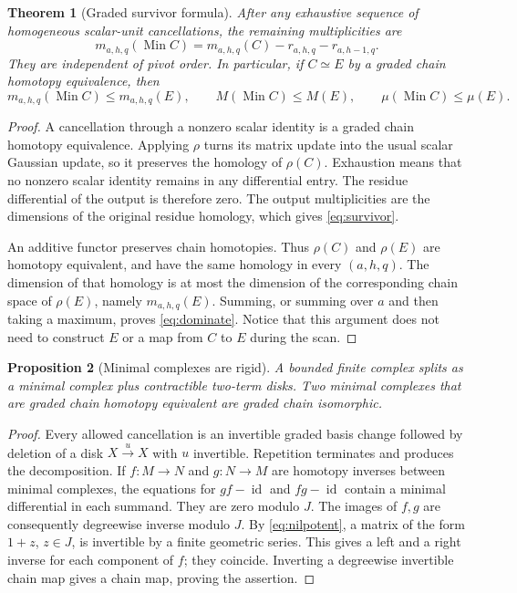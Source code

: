 \documentclass[11pt,letterpaper]{article}
\newtheorem{theorem}{Theorem}[section]
\newtheorem{proposition}[theorem]{Proposition}
\theoremstyle{remark}\newtheorem{remark}[theorem]{Remark}
\newcommand{\Min}{\operatorname{Min}}
\newcommand{\id}{\operatorname{id}}
\begin{document}
\begin{theorem}[Graded survivor formula]\label{thm:survivor}
After any exhaustive sequence of homogeneous scalar-unit cancellations, the remaining multiplicities are
\begin{equation}\label{eq:survivor}
 m_{a,h,q}(\Min C)=m_{a,h,q}(C)-r_{a,h,q}-r_{a,h-1,q}.
\end{equation}
They are independent of pivot order. In particular, if $C\simeq E$ by a graded chain homotopy equivalence, then
\begin{equation}\label{eq:dominate}
 m_{a,h,q}(\Min C)\le m_{a,h,q}(E),\qquad
 M(\Min C)\le M(E),\qquad \mu(\Min C)\le\mu(E).
\end{equation}
\end{theorem}
\begin{proof}
A cancellation through a nonzero scalar identity is a graded chain homotopy equivalence. Applying $\rho$ turns its matrix update into the usual scalar Gaussian update, so it preserves the homology of $\rho(C)$. Exhaustion means that no nonzero scalar identity remains in any differential entry. The residue differential of the output is therefore zero. The output multiplicities are the dimensions of the original residue homology, which gives \eqref{eq:survivor}.

An additive functor preserves chain homotopies. Thus $\rho(C)$ and $\rho(E)$ are homotopy equivalent, and have the same homology in every $(a,h,q)$. The dimension of that homology is at most the dimension of the corresponding chain space of $\rho(E)$, namely $m_{a,h,q}(E)$. Summing, or summing over $a$ and then taking a maximum, proves \eqref{eq:dominate}. Notice that this argument does not need to construct $E$ or a map from $C$ to $E$ during the scan.
\end{proof}

\begin{proposition}[Minimal complexes are rigid]\label{prop:rigid}
A bounded finite complex splits as a minimal complex plus contractible two-term disks. Two minimal complexes that are graded chain homotopy equivalent are graded chain isomorphic.
\end{proposition}
\begin{proof}
Every allowed cancellation is an invertible graded basis change followed by deletion of a disk $X\xrightarrow{u}X$ with $u$ invertible. Repetition terminates and produces the decomposition. If $f:M\to N$ and $g:N\to M$ are homotopy inverses between minimal complexes, the equations for $gf-\id$ and $fg-\id$ contain a minimal differential in each summand. They are zero modulo $J$. The images of $f,g$ are consequently degreewise inverse modulo $J$. By \eqref{eq:nilpotent}, a matrix of the form $1+z$, $z\in J$, is invertible by a finite geometric series. This gives a left and a right inverse for each component of $f$; they coincide. Inverting a degreewise invertible chain map gives a chain map, proving the assertion.
\end{proof}
\end{document}
